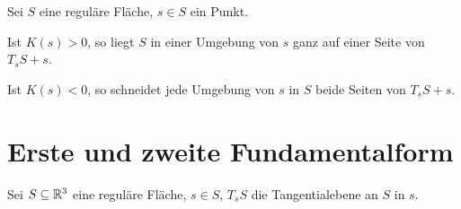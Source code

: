 \begin{bemerkung}%
    Sei $S$ eine reguläre Fläche, $s \in S$ ein Punkt.
    \begin{bemenum}
        \item Ist $K(s) > 0$, so liegt $S$ in einer Umgebung von $s$
              ganz auf einer Seite von $T_s S + s$.
        \item Ist $K(s) < 0$, so schneidet jede Umgebung von $s$ in $S$
              beide Seiten von $T_s S + s$.
    \end{bemenum}
\end{bemerkung}

\section{Erste und zweite Fundamentalform}%
Sei $S \subseteq \mathbb{R}^3$ eine reguläre Fläche, $s \in S$, $T_s S$ die Tangentialebene
an $S$ in $s$.

